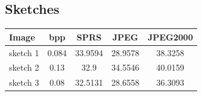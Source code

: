 \begin{figure}[H]
\centering
{}
\hspace{5mm}
\hspace{5mm}
\end{figure}



\newpage
\subsection{Sketches}

\begin{table}[H]
\centering
\begin{tabular}{| l c | c | c | c|}
\hline\hline
Image & bpp & SPRS & JPEG & JPEG2000 \\
\hline
sketch 1 & 0.084 & 33.9594 & 28.9578 & 38.3258  \\
sketch 2 & 0.13 & 32.9 & 34.5546 &  40.0159 \\
sketch 3 & 0.08 & 32.5131 & 28.6558 & 36.3093  \\
\hline
\end{tabular}
\end{table}

